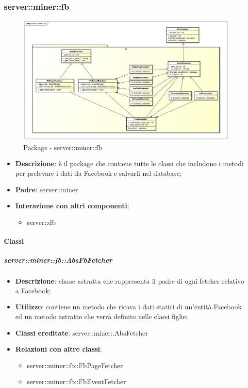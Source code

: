 \subsubsection{server::miner::fb} %
\label{ssub:bdsm_app_server_miner_fb}
\begin{figure}[htbp]
	\centering
	\centerline{\includegraphics[scale=0.3]{./images/server/miner_fb.pdf}}
	\caption{Package - server::miner::fb}
\end{figure}

\begin{itemize}
  \item \textbf{Descrizione}: è il package che contiene tutte le classi che includono i metodi per prelevare i dati da Facebook e salvarli nel database;
  \item \textbf{Padre}: server::miner
  \item \textbf{Interazione con altri componenti}:
  	\begin{itemize}
  		\item server::db
  	\end{itemize}
\end{itemize}

	\paragraph{Classi} %
		\subparagraph{server::miner::fb::AbsFbFetcher} %
		\label{subp:server_miner_fb_AbsFbFetcher}
			\begin{itemize}
				\item \textbf{Descrizione}: classe astratta che rappresenta il padre di ogni fetcher relativo a Facebook;
				\item \textbf{Utilizzo}: contiene un metodo che ricava i dati statici di un'entità Facebook ed un metodo astratto che verrà definito nelle classi figlie;
				\item \textbf{Classi ereditate}: server::miner::AbsFetcher
				\item \textbf{Relazioni con altre classi}:
					\begin{itemize}
						\item server::miner::fb::FbPageFetcher
						\item server::miner::fb::FbEventFetcher
					\end{itemize}
			\end{itemize}

